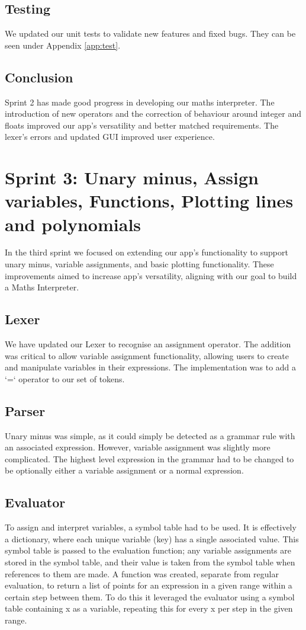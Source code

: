 \documentclass[a4paper, oneside, 11pt]{report}
\begin{document}
\subsection{Testing}
We updated our unit tests to validate new features and fixed bugs. They can be seen under Appendix \ref{app:test}.

\subsection{Conclusion}
Sprint 2 has made good progress in developing our maths interpreter. The introduction of new operators and the correction of behaviour around integer and floats improved our app's versatility and better matched requirements. The lexer's errors and updated GUI improved user experience.


\section{Sprint 3: Unary minus, Assign variables, Functions, Plotting lines and polynomials}
In the third sprint we focused on extending our app’s functionality to support unary minus, variable assignments, and basic plotting functionality. These improvements aimed to increase app’s versatility, aligning with our goal to build a Maths Interpreter.

\subsection{Lexer}
We have updated our Lexer to recognise an assignment operator. The addition was critical to allow variable assignment functionality, allowing users to create and manipulate variables in their expressions. The implementation was to add a ‘=‘ operator to our set of tokens.

\subsection{Parser}
Unary minus was simple, as it could simply be detected as a grammar rule with an associated expression. However, variable assignment was slightly more complicated. The highest level expression in the grammar had to be changed to be optionally either a variable assignment or a normal expression.


\subsection{Evaluator}
To assign and interpret variables, a symbol table had to be used. It is effectively a dictionary, where each unique variable (key) has a single associated value. This symbol table is passed to the evaluation function; any variable assignments are stored in the symbol table, and their value is taken from the symbol table when references to them are made.
A function was created, separate from regular evaluation, to return a list of points for an expression in a given range within a certain step between them. To do this it leveraged the evaluator using a symbol table containing x as a variable, repeating this for every x per step in the given range.
\end{document}
